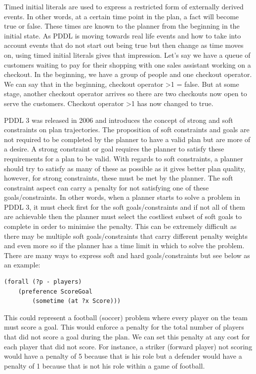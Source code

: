Timed initial literals are used to express a restricted form of externally derived events. In other words, at a certain time point in the plan, a fact will become true or false. These times are known to the planner from the beginning in the initial state. As PDDL is moving towards real life events and how to take into account events that do not start out being true but then change as time moves on, using timed initial literals gives that impression. Let's say we have a queue of customers waiting to pay for their shopping with one sales assistant working on a checkout. In the beginning, we have a group of people and one checkout operator. We can say that in the beginning, checkout operator >1 = false. But at some stage, another checkout operator arrives so there are two checkouts now open to serve the customers. Checkout operator >1 has now changed to true. 

PDDL 3 was released in 2006 and introduces the concept of strong and soft constraints on plan trajectories\cite{PDDL3}. The proposition of soft constraints and goals are not required to be completed by the planner to have a valid plan but are more of a desire. A strong constraint or goal requires the planner to satisfy these requirements for a plan to be valid. With regards to soft constraints, a planner should try to satisfy as many of these as possible as it gives better plan quality, however, for strong constraints, these must be met by the planner. The soft constraint aspect can carry a penalty for not satisfying one of these goals/constraints. In other words, when a planner starts to solve a problem in PDDL 3, it must check first for the soft goals/constraints and if not all of them are achievable then the planner must select the costliest subset of soft goals to complete in order to minimise the penalty. This can be extremely difficult as there may be multiple soft goals/constraints that carry different penalty weights and even more so if the planner has a time limit in which to solve the problem. 
There are many ways to express soft and hard goals/constraints but see below as an example:
\begin{verbatim}
(forall (?p - players)
	(preference ScoreGoal
		(sometime (at ?x Score)))
\end{verbatim} 
This could represent a football (soccer) problem where every player on the team must score a goal. This would enforce a penalty for the total number of players that did not score a goal during the plan. We can set this penalty at any cost for each player that did not score. For instance, a striker (forward player) not scoring would have a penalty of 5 because that is his role but a defender would have a penalty of 1 because that is not his role within a game of football.

